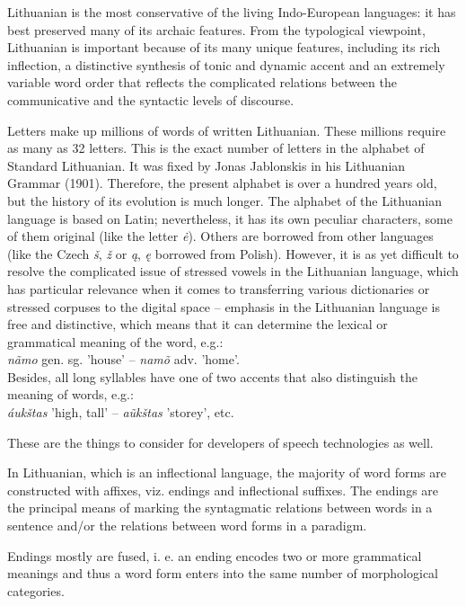 \documentclass[]{../metanetpaper}
\begin{document}
\begin{multicols}{2}
Lithuanian is the most conservative of the living Indo-European languages: it has best preserved many of its archaic features. From the typological viewpoint, Lithuanian is important because of its many unique features, including its rich inflection, a distinctive synthesis of tonic and dynamic accent and an extremely variable word order that reflects the complicated relations between the communicative and the syntactic levels of discourse.


 Letters make up millions of words of written Lithuanian. These millions require as many as 32 letters. This is the exact number of letters in the alphabet of Standard Lithuanian. It was fixed by Jonas Jablonskis in his Lithuanian Grammar (1901). Therefore, the present alphabet is over a hundred years old, but the history of its evolution is much longer. The alphabet of the Lithuanian language is based on Latin; nevertheless, it has its own peculiar characters, some of them original (like the letter \textit{ė}). Others are borrowed from other languages (like the Czech \textit{š}, \textit{ž} or \textit{ą}, \textit{ę} borrowed from Polish). However, it is as yet difficult to resolve the complicated issue of stressed vowels in the Lithuanian language, which has particular relevance when it comes to transferring various dictionaries or stressed corpuses to the digital space – emphasis in the Lithuanian language is free and distinctive, which means that it can determine the lexical or grammatical meaning of the word, e.g.:\\
    \textit{nãmo} gen. sg. 'house' – \textit{namõ}  adv. 'home'.\\
      Besides, all long syllables have one of two accents that also distinguish the meaning of words, e.g.:\\
    \textit{áukštas } 'high, tall' –  \textit{aũkštas }  'storey', etc.

      These are the things to consider for developers of speech technologies as well.

    In Lithuanian, which is an inflectional language, the majority of word forms are constructed with affixes, viz. endings and inflectional suffixes. The endings are the principal means of marking the syntagmatic relations between words in a sentence and/or the relations between word forms in a paradigm.

   Endings mostly are fused, i. e. an ending encodes two or more grammatical meanings and thus a word form enters into the same number of morphological categories.


\end{multicols}
\end{document}
